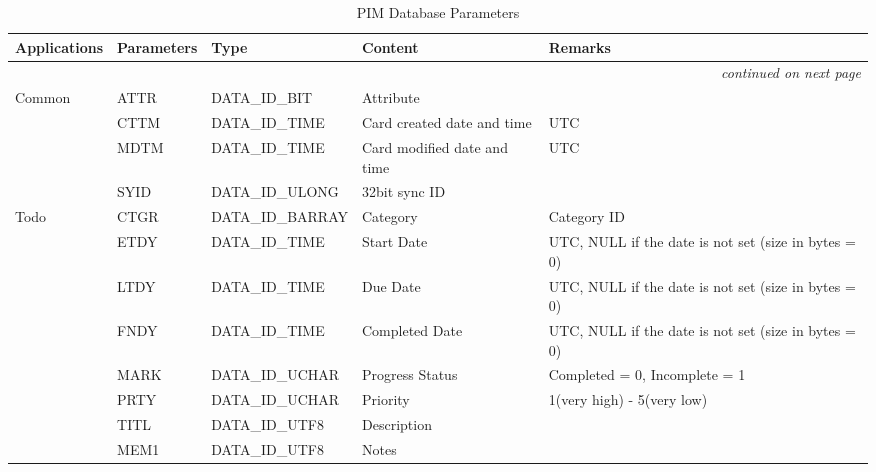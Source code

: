 \small
\setlongtables
    \begin{longtable}[c]{|l|l|l|p{3cm}|p{5cm}|}
      \caption{PIM Database Parameters} \\
      \hline
      Applications & Parameters & Type & Content & Remarks \\
      \hline
      \endhead
      \hline
      \multicolumn{5}{|r|}{\small\slshape continued on next page} \\
      \hline
      \endfoot
      \hline
      \endlastfoot
        \hline
        \label{paramtable}
        Common & ATTR & DATA\_ID\_BIT & Attribute & \\
        & CTTM & DATA\_ID\_TIME & Card created date and time & UTC \\
        & MDTM & DATA\_ID\_TIME & Card modified date and time & UTC \\
        & SYID & DATA\_ID\_ULONG & 32bit sync ID & \\
        \hline

        Todo & CTGR & DATA\_ID\_BARRAY & Category & Category ID \\
        & ETDY & DATA\_ID\_TIME & Start Date & UTC, NULL if the date is not
        set (size in bytes = 0) \\
        & LTDY & DATA\_ID\_TIME & Due Date & UTC, NULL if the date is not set
        (size in bytes = 0) \\ 
        & FNDY & DATA\_ID\_TIME & Completed Date & UTC, NULL if the date is
        not set (size in bytes = 0) \\
        & MARK & DATA\_ID\_UCHAR & Progress Status & Completed = 0, Incomplete
        = 1 \\
        & PRTY & DATA\_ID\_UCHAR & Priority & 1(very high) - 5(very low) \\
        & TITL & DATA\_ID\_UTF8 & Description & \\
        & MEM1 & DATA\_ID\_UTF8 & Notes & \\
        \hline


\end{longtable}
